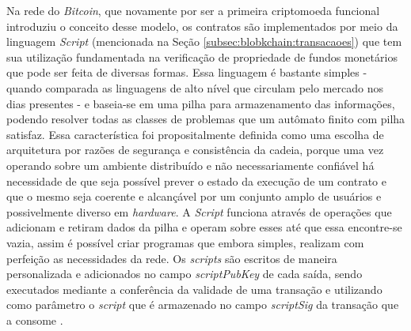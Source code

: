 Na rede do \textit{Bitcoin}, que novamente por ser a primeira criptomoeda funcional introduziu o conceito desse modelo, os contratos são implementados por meio da linguagem \textit{Script} (mencionada na Seção \ref{subsec:blobkchain:transacaoes}) que tem sua utilização fundamentada na verificação de propriedade de fundos monetários que pode ser feita de diversas formas. Essa linguagem é bastante simples - quando comparada as linguagens de alto nível que circulam pelo mercado nos dias presentes - e baseia-se em uma pilha para armazenamento das informações, podendo resolver todas as classes de problemas que um autômato finito com pilha satisfaz. Essa característica foi propositalmente definida como uma escolha de arquitetura por razões de segurança e consistência da cadeia, porque uma vez operando sobre um ambiente distribuído e não necessariamente confiável há necessidade de que seja possível prever o estado da execução de um contrato e que o mesmo seja coerente e alcançável por um conjunto amplo de usuários e possivelmente diverso em \textit{hardware}. A \textit{Script} funciona através de operações que adicionam e retiram dados da pilha e operam sobre esses até que essa encontre-se vazia, assim é possível criar programas que embora simples, realizam com perfeição as necessidades da rede. Os \textit{scripts} são escritos de maneira personalizada e adicionados no campo \textit{scriptPubKey} de cada saída, sendo executados mediante a conferência da validade de uma transação e utilizando como parâmetro o \textit{script} que é armazenado no campo \textit{scriptSig} da transação que a consome \cite{blockchain:documentacao_bitcoin}.

